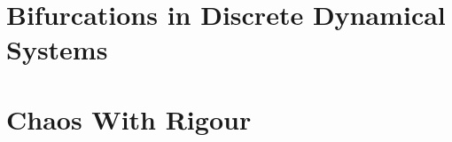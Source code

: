 \documentclass[12pt,oneside]{report}
\begin{document}
\maketitle
\tableofcontents


\chapter{Bifurcations in Discrete Dynamical Systems}


\chapter{Chaos With Rigour}


\printbibliography
\end{document}
